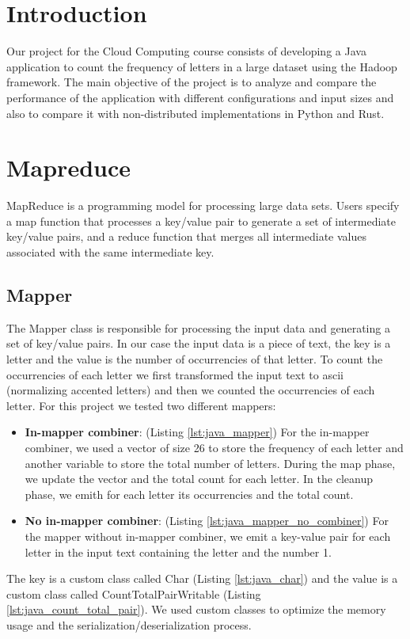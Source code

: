 \documentclass{article}
\begin{document}
\begin{multicols}{2}
\section{Introduction}
    Our project for the Cloud Computing course consists of developing a Java application to count
    the frequency of letters in a large dataset using the Hadoop framework.
    The main objective of the project is to analyze and compare the performance of the application
    with different configurations and input sizes and also to compare it with non-distributed
    implementations in Python and Rust.
\section{Mapreduce}
    MapReduce is a programming model for processing large data sets. 
    Users specify a map function that processes a key/value pair to generate a set
    of intermediate key/value pairs, and a reduce function that merges all intermediate values
    associated with the same intermediate key.
\subsection{Mapper}
    The Mapper class is responsible for processing the input data and generating a set of key/value pairs.
    In our case the input data is a piece of text, the key is a letter and the value is the number of 
    occurrencies of that letter.
    To count the occurrencies of each letter we first transformed the input text to ascii (normalizing accented
    letters) and then we counted the occurrencies of each letter.
    For this project we tested two different mappers:
    \begin{itemize}
        \item \textbf{In-mapper combiner}: (Listing \ref{lst:java_mapper}) 
        For the in-mapper combiner, we used a vector of size 26 to store the frequency of each letter and
        another variable to store the total number of letters. During the map phase, we update the vector
        and the total count for each letter. In the cleanup phase, we emith for each letter its occurrencies 
        and the total count.
        \item \textbf{No in-mapper combiner}: (Listing \ref{lst:java_mapper_no_combiner})
        For the mapper without in-mapper combiner, we emit a key-value pair for each letter in the input text
        containing the letter and the number 1.
    \end{itemize}
    The key is a custom class called Char (Listing \ref{lst:java_char}) and the value is a custom class 
    called CountTotalPairWritable (Listing \ref{lst:java_count_total_pair}).
    We used custom classes to optimize the memory usage and the serialization/deserialization process.

\end{multicols}
\end{document}
